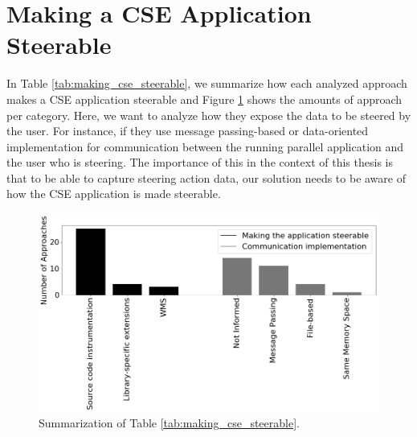 \section{Making a CSE Application Steerable}

In Table \ref{tab:making_cse_steerable}, we summarize how each analyzed approach makes a CSE application steerable and Figure \ref{fig:figtab3.2} shows the amounts of approach per category.
Here, we want to analyze how they expose the data to be steered by the user. For instance, if they use message passing-based or
data-oriented implementation for communication between the running
parallel application and the user who is steering. The importance of this in the context of this thesis is that to be able to capture steering action data, our solution needs to be aware of how the CSE application is made steerable.





\begin{figure}[H]
    \centering
    \includegraphics[width=\textwidth,keepaspectratio]{img/tab32.png}
    \caption{Summarization of Table \ref{tab:making_cse_steerable}.}
    \label{fig:figtab3.2}
\end{figure}


